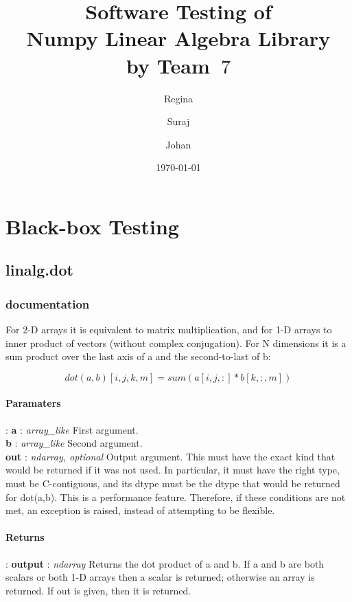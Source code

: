 \documentclass[a4paper,11pt]{article}
\title{\textbf{Software Testing of \\ Numpy Linear Algebra Library\\
        by Team~$7$                                   %
}
}
\author{Regina \and Suraj \and Johan}  %
\date{\today}
\begin{document}
	\maketitle
	\tableofcontents 
	
\newpage
\section{Black-box Testing}
\subsection{linalg.dot}
\subsubsection{documentation}
For 2-D arrays it is equivalent to matrix multiplication, and for 1-D arrays to inner product of vectors (without complex conjugation). For N dimensions it is a sum product over the last axis of a and the second-to-last of b:

    \begin{equation} dot(a, b)[i,j,k,m] = sum(a[i,j,:] * b[k,:,m]) \end{equation}
    
   \paragraph{Paramaters}: \textbf{a} : \textit{array\_like} First argument.\\
	\indent \hspace{2.2cm} \textbf{b} : \textit{array\_like} Second argument.\\
\indent \hspace{2.2cm} \textbf{out} : \textit{ndarray, optional} Output argument. This must have the exact kind that would be returned if it was not used. In particular, it must have the right type, must be C-contiguous, and its dtype must be the dtype that would be returned for dot(a,b). This is a performance feature. Therefore, if these conditions are not met, an exception is raised, instead of attempting to be flexible.
    \paragraph{Returns}:    \textbf{output} : \textit{ndarray}
Returns the dot product of a and b. If a and b are both scalars or both 1-D arrays then a scalar is returned; otherwise an array is returned. If out is given, then it is returned.\\
\end{document}
